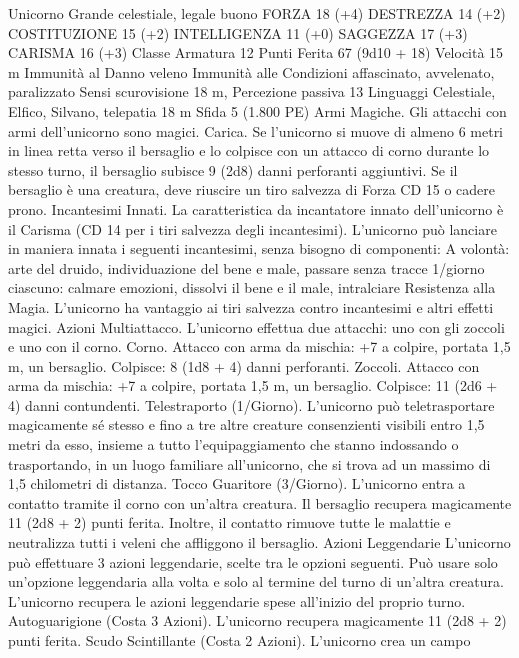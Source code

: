 \begin{multicols}{2}
Unicorno
Grande celestiale, legale buono
FORZA 18 (+4)
DESTREZZA 14 (+2)
COSTITUZIONE 15 (+2)
INTELLIGENZA 11 (+0)
SAGGEZZA 17 (+3)
CARISMA 16 (+3)
Classe Armatura 12
Punti Ferita 67 (9d10 + 18)
Velocità 15 m
Immunità al Danno veleno
Immunità alle Condizioni affascinato, avvelenato, paralizzato
Sensi scurovisione 18 m, Percezione passiva 13
Linguaggi Celestiale, Elfico, Silvano, telepatia 18 m
Sfida 5 (1.800 PE)
Armi Magiche. Gli attacchi con armi dell’unicorno sono magici.
Carica. Se l’unicorno si muove di almeno 6 metri in linea retta
verso il bersaglio e lo colpisce con un attacco di corno durante lo
stesso turno, il bersaglio subisce 9 (2d8) danni perforanti
aggiuntivi. Se il bersaglio è una creatura, deve riuscire un tiro
salvezza di Forza CD 15 o cadere prono.
Incantesimi Innati. La caratteristica da incantatore innato
dell’unicorno è il Carisma (CD 14 per i tiri salvezza degli
incantesimi). L’unicorno può lanciare in maniera innata i
seguenti incantesimi, senza bisogno di componenti:
A volontà: arte del druido, individuazione del bene e male,
passare senza tracce
1/giorno ciascuno: calmare emozioni, dissolvi il bene e il male,
intralciare
Resistenza alla Magia. L’unicorno ha vantaggio ai tiri salvezza
contro incantesimi e altri effetti magici.
Azioni
Multiattacco. L’unicorno effettua due attacchi: uno con gli
zoccoli e uno con il corno.
Corno. Attacco con arma da mischia: +7 a colpire, portata 1,5 m,
un bersaglio.
Colpisce: 8 (1d8 + 4) danni perforanti.
Zoccoli. Attacco con arma da mischia: +7 a colpire, portata 1,5
m, un bersaglio.
Colpisce: 11 (2d6 + 4) danni contundenti.
Telestraporto (1/Giorno). L’unicorno può teletrasportare
magicamente sé stesso e fino a tre altre creature consenzienti
visibili entro 1,5 metri da esso, insieme a tutto
l’equipaggiamento che stanno indossando o trasportando, in un
luogo familiare all’unicorno, che si trova ad un massimo di 1,5
chilometri di distanza.
Tocco Guaritore (3/Giorno). L’unicorno entra a contatto tramite
il corno con un’altra creatura. Il bersaglio recupera magicamente
11 (2d8 + 2) punti ferita. Inoltre, il contatto rimuove tutte le
malattie e neutralizza tutti i veleni che affliggono il bersaglio.
Azioni Leggendarie
L’unicorno può effettuare 3 azioni leggendarie, scelte tra le
opzioni seguenti. Può usare solo un’opzione leggendaria alla
volta e solo al termine del turno di un’altra creatura. L’unicorno
recupera le azioni leggendarie spese all’inizio del proprio turno.
Autoguarigione (Costa 3 Azioni). L’unicorno recupera
magicamente 11 (2d8 + 2) punti ferita.
Scudo Scintillante (Costa 2 Azioni). L’unicorno crea un campo

\end{multicols}
